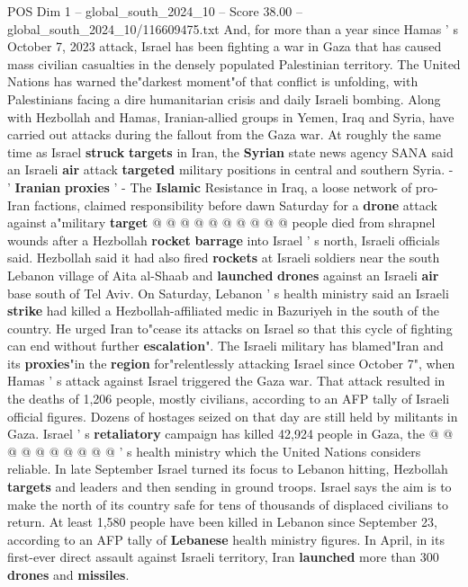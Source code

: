 \begin{textsample}{POS Dim 1 – global\_south\_2024\_10 – Score 38.00 – global\_south\_2024\_10/116609475.txt}
And, for more than a year since Hamas ' s October 7, 2023 attack, Israel has been fighting a war in Gaza that has caused mass civilian casualties in the densely populated Palestinian territory.
The United Nations has warned the"darkest moment"of that conflict is unfolding, with Palestinians facing a dire humanitarian crisis and daily Israeli bombing.
Along with Hezbollah and Hamas, Iranian-allied groups in Yemen, Iraq and Syria, have carried out attacks during the fallout from the Gaza war.
At roughly the same time as Israel \textbf{struck} \textbf{targets} in Iran, the \textbf{Syrian} state news agency SANA said an Israeli \textbf{air} attack \textbf{targeted} military positions in central and southern Syria. - ' \textbf{Iranian} \textbf{proxies} ' - The \textbf{Islamic} Resistance in Iraq, a loose network of pro-Iran factions, claimed responsibility before dawn Saturday for a \textbf{drone} attack against a"military \textbf{target} @ @ @ @ @ @ @ @ @ @ people died from shrapnel wounds after a Hezbollah \textbf{rocket} \textbf{barrage} into Israel ' s north, Israeli officials said.
Hezbollah said it had also fired \textbf{rockets} at Israeli soldiers near the south Lebanon village of Aita al-Shaab and \textbf{launched} \textbf{drones} against an Israeli \textbf{air} base south of Tel Aviv.
On Saturday, Lebanon ' s health ministry said an Israeli \textbf{strike} had killed a Hezbollah-affiliated medic in Bazuriyeh in the south of the country.
He urged Iran to"cease its attacks on Israel so that this cycle of fighting can end without further \textbf{escalation}".
The Israeli military has blamed"Iran and its \textbf{proxies}"in the \textbf{region} for"relentlessly attacking Israel since October 7", when Hamas ' s attack against Israel triggered the Gaza war.
That attack resulted in the deaths of 1,206 people, mostly civilians, according to an AFP tally of Israeli official figures.
Dozens of hostages seized on that day are still held by militants in Gaza.
Israel ' s \textbf{retaliatory} campaign has killed 42,924 people in Gaza, the @ @ @ @ @ @ @ @ @ @ ' s health ministry which the United Nations considers reliable.
In late September Israel turned its focus to Lebanon hitting, Hezbollah \textbf{targets} and leaders and then sending in ground troops.
Israel says the aim is to make the north of its country safe for tens of thousands of displaced civilians to return.
At least 1,580 people have been killed in Lebanon since September 23, according to an AFP tally of \textbf{Lebanese} health ministry figures.
In April, in its first-ever direct assault against Israeli territory, Iran \textbf{launched} more than 300 \textbf{drones} and \textbf{missiles}.

\end{textsample}
